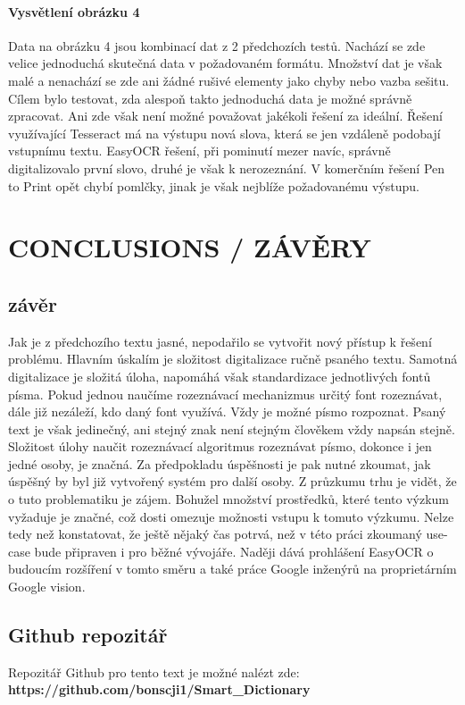\documentclass[journal]{IEEEtran}
\begin{document}
\paragraph{Vysvětlení obrázku 4}
Data na obrázku 4 jsou kombinací dat z 2 předchozích testů.
Nachází se zde velice jednoduchá skutečná data v požadovaném formátu.
Množství dat je však malé a nenachází se zde ani žádné rušivé elementy jako chyby nebo vazba sešitu.
Cílem bylo testovat, zda alespoň takto jednoduchá data je možné správně zpracovat.
Ani zde však není možné považovat jakékoli řešení za ideální.
Řešení využívající Tesseract má na výstupu nová slova, která se jen vzdáleně podobají vstupnímu textu.
EasyOCR řešení, při pominutí mezer navíc, správně digitalizovalo první slovo,  druhé je však k nerozeznání.
V komerčním řešení Pen to Print opět chybí pomlčky, jinak je však nejblíže požadovanému výstupu.


\section{CONCLUSIONS / ZÁVĚRY}
\subsection{závěr}
Jak je z předchozího textu jasné, nepodařilo se vytvořit nový přístup k řešení problému.
Hlavním úskalím je složitost digitalizace ručně psaného textu.
Samotná digitalizace je složitá úloha, napomáhá však standardizace jednotlivých fontů písma.
Pokud jednou naučíme rozeznávací mechanizmus určitý font rozeznávat, dále již nezáleží, kdo daný font využívá.
Vždy je možné písmo rozpoznat.
Psaný text je však jedinečný, ani stejný znak není stejným člověkem vždy napsán stejně.
Složitost úlohy naučit rozeznávací algoritmus rozeznávat písmo, dokonce i jen jedné osoby, je značná.
Za předpokladu úspěšnosti je pak nutné zkoumat, jak úspěšný by byl již vytvořený systém pro další osoby.
Z průzkumu trhu je vidět, že o tuto problematiku je zájem.
Bohužel množství prostředků, které tento výzkum vyžaduje je značné, což dosti omezuje možnosti vstupu k tomuto výzkumu.
Nelze tedy než konstatovat, že ještě nějaký čas potrvá, než v této práci zkoumaný use-case bude připraven i pro běžné vývojáře.
Naději dává prohlášení EasyOCR o budoucím rozšíření v tomto směru a také práce Google inženýrů na proprietárním Google vision.

\subsection{Github repozitář}
Repozitář Github pro tento text je možné nalézt zde: \textbf{https://github.com/bonscji1/Smart\_Dictionary}



\printbibliography

\printacronyms


\end{document}
